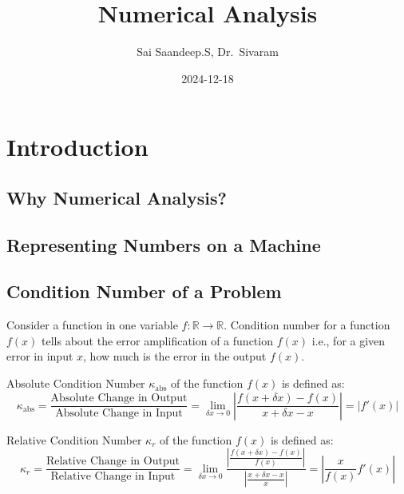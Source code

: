 \documentclass[
]{book}
\title{Numerical Analysis}
\author{Sai Saandeep.S, Dr.~Sivaram}
\date{2024-12-18}
\begin{document}
\maketitle

{
\setcounter{tocdepth}{1}
\tableofcontents
}
\hypertarget{introduction}{%
\chapter{Introduction}\label{introduction}}

\hypertarget{why-numerical-analysis}{%
\section{Why Numerical Analysis?}\label{why-numerical-analysis}}

\hypertarget{representing-numbers-on-a-machine}{%
\section{Representing Numbers on a Machine}\label{representing-numbers-on-a-machine}}

\hypertarget{condition-number-of-a-problem}{%
\section{Condition Number of a Problem}\label{condition-number-of-a-problem}}

Consider a function in one variable \(f:\mathbb{R}\to\mathbb{R}\).
Condition number for a function \(f(x)\) tells about the error amplification of a function \(f(x)\) i.e., for a given error in input \(x\), how much is the error in the output \(f(x)\).

Absolute Condition Number \(\kappa_{\text{abs}}\) of the function \(f(x)\) is defined as:
\begin{equation}
\kappa_{\text{abs}} = \frac{\text{Absolute Change in Output}}{\text{Absolute Change in Input}} = \lim_{\delta x \to 0} \left\lvert{\frac{f(x+\delta x)-f(x)}{x+\delta x - x}}\right\rvert = \left\lvert{f'(x)}\right\rvert
\end{equation}

Relative Condition Number \(\kappa_{r}\) of the function \(f(x)\) is defined as:
\begin{equation}
\kappa_{r} = \frac{\text{Relative Change in Output}}{\text{Relative Change in Input}} = \lim_{\delta x \to 0} \frac{\left\lvert{\frac{f(x+\delta x)-f(x)}{f(x)}}\right\rvert}{\left\lvert{\frac{x+\delta x - x}{x}}\right\rvert} = \left\lvert{\frac{x}{f(x)}f'(x)}\right\rvert
\end{equation}
\end{document}
